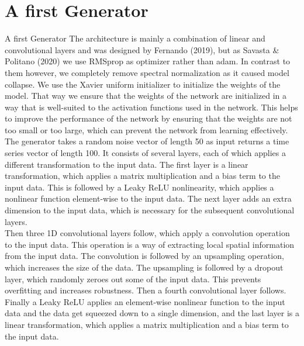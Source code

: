 \documentclass{article}
\begin{document}
\section{A first Generator}
A first Generator
The architecture is mainly a combination of linear and convolutional layers and was designed by Fernando (2019), but as Savasta \& Politano (2020) we use RMSprop as optimizer rather than adam. In contrast to them however, we completely remove spectral normalization as it caused model collapse. We use the Xavier uniform initializer to initialize the weights of the model. That way we ensure that the weights of the network are initialized in a way that is well-suited to the activation functions used in the network. This helps to improve the performance of the network by ensuring that the weights are not too small or too large, which can prevent the network from learning effectively. \\
The generator takes a random noise vector of length 50 as input returns a time series vector of length 100. It consists of several layers, each of which applies a different transformation to the input data. The first layer is a linear transformation, which applies a matrix multiplication and a bias term to the input data. This is followed by a Leaky ReLU nonlinearity, which applies a nonlinear function element-wise to the input data. The next layer adds an extra dimension to the input data, which is necessary for the subsequent convolutional layers. \\
Then three 1D convolutional layers follow, which apply a convolution operation to the input data. This operation is a way of extracting local spatial information from the input data. The convolution is followed by an upsampling operation, which increases the size of the data. The upsampling is followed by a dropout layer, which randomly zeroes out some of the input data. This prevents overfitting and increases robustness. Then a fourth convolutional layer follows. \\
Finally a Leaky ReLU applies an element-wise nonlinear function to the input data and the data get squeezed down to a single dimension, and the last layer is a linear transformation, which applies a matrix multiplication and a bias term to the input data.
\end{document}
